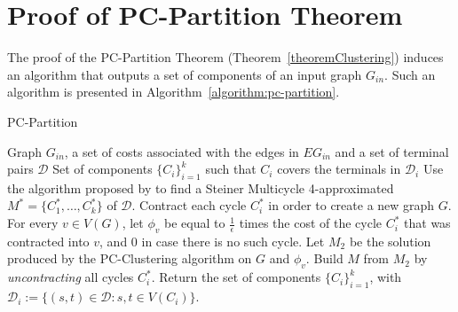 \section{Proof of PC-Partition Theorem}

The proof of the PC-Partition Theorem (Theorem~\ref{theoremClustering}) induces an algorithm that outputs a set of components of an input graph \(G_{in}\). Such an algorithm is presented in Algorithm~\ref{algorithm:pc-partition}.

\begin{algorithm}[H]
\caption{PC-Partition}
\label{algorithm:pc-partition}
\begin{algorithmic}[1]

\Require Graph \(G_{in}\), a set of costs associated with the edges in \(E{G_{in}}\) and a set of terminal pairs \(\mathcal{D}\)
\Ensure Set of components \(\{C_i\}_{i=1}^k\) such that \(C_i\) covers the terminals in \(\mathcal{D}_i\)
\State Use the algorithm proposed by \cite{Pereira2018TheSM} to find a Steiner Multicycle 4-approximated \(M^\ast = \{C^\ast_1, \dots, C^\ast_k\}\) of \(\mathcal{D}\).
\State Contract each cycle \(C_i^\ast\) in order to create a new graph \(G\).
\State For every \(v \in V(G)\), let \(\phi_v\) be equal to \(\frac{1}{\epsilon}\) times the cost of the cycle \(C_i^\ast\) that was contracted into \(v\), and \(0\) in case there is no such cycle.
\State Let \(M_2\) be the solution produced by the PC-Clustering algorithm on \(G\) and \(\phi_v\).
\State Build \(M\) from \(M_2\) by \emph{uncontracting} all cycles \(C_i^\ast\).
\State Return the set of components \(\{C_i\}_{i=1}^k\), with \(\mathcal{D}_i := \{(s, t) \in \mathcal{D}: s, t \in V(C_i)\}\).

\end{algorithmic}
\end{algorithm}

